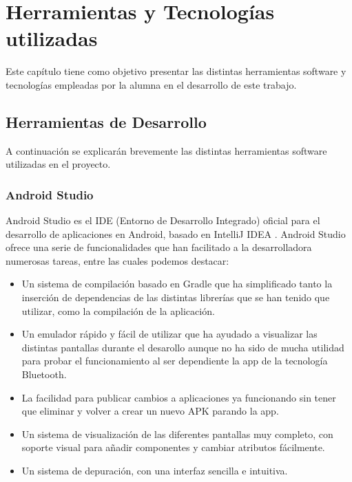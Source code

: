 %
%
%

\cleardoublepage
\chapter{Herramientas y Tecnologías utilizadas} \label{chap:Tecnologias} 

Este capítulo tiene como objetivo presentar las distintas herramientas software y tecnologías empleadas por la alumna en el desarrollo de este trabajo.

\section{Herramientas de Desarrollo}

A continuación se explicarán brevemente las distintas herramientas software utilizadas en el proyecto. 

\subsection{Android Studio}

Android Studio \cite{URL::AndroidStudio} es el IDE (Entorno de Desarrollo Integrado) oficial para el desarrollo de aplicaciones en Android, basado en IntelliJ IDEA \cite{URL::IntelliJIDEA}. Android Studio ofrece una serie de funcionalidades que han facilitado a la desarrolladora numerosas tareas, entre las cuales podemos destacar:


\begin{itemize}
\item Un sistema de compilación basado en Gradle\cite{URL::Gradle} que ha simplificado tanto la inserción de dependencias de las distintas librerías que se han tenido que utilizar, como la compilación de la aplicación.
\item Un emulador rápido y fácil de utilizar que ha ayudado a visualizar las distintas pantallas durante el desarollo aunque no ha sido de mucha utilidad para probar el funcionamiento al ser dependiente la app de la tecnología Bluetooth.
\item La facilidad para publicar cambios a aplicaciones ya funcionando sin tener que eliminar y volver a crear un nuevo APK parando la app.
\item Un sistema de visualización de las diferentes pantallas muy completo, con soporte visual para añadir componentes y cambiar atributos fácilmente.
\item Un sistema de depuración, con una interfaz sencilla e intuitiva.
\end{itemize} 

